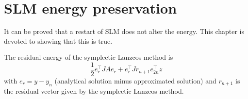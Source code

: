 \chapter{SLM energy preservation}
It can be proved that a restart of SLM does not alter the energy. This chapter is devoted to showing that this is true.

The residual energy of the symplectic Lanzcos method is
\begin{equation}
\frac{1}{2} e_r^{\top} J A e_r + e_r^\top J r_{n+1} e_{2n}^\top z
\end{equation}
with $ e_r = y-y_n $ (analytical solution minus approximated solution) and $r_{n+1}$ is the residual vector given by the symplectic Lanzcos method. 

